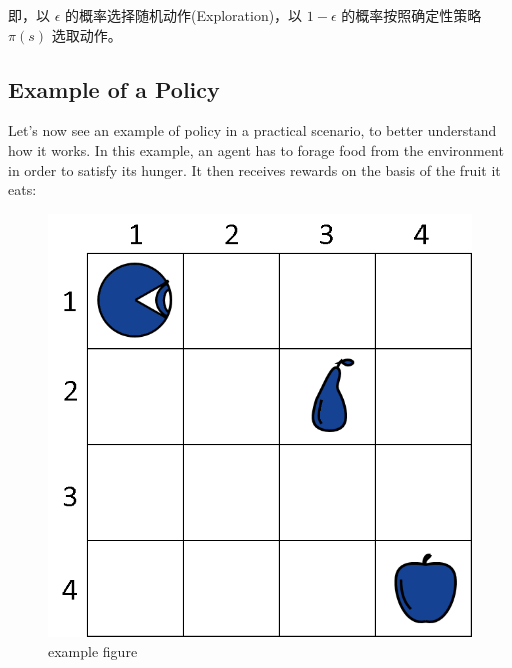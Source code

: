 即，以 $\epsilon$ 的概率选择随机动作(Exploration)，以 $1 - \epsilon$ 
的概率按照确定性策略 $\pi(s)$ 选取动作。


\subsection{Example of a Policy}

Let's now see an example of policy in a practical scenario, 
to better understand how it works. In this example, an agent 
has to forage food from the environment in order to satisfy 
its hunger. It then receives rewards on the basis of the 
fruit it eats:

\begin{figure}[h]

\centering
\includegraphics[scale=0.5]{pix/example1.png}
\caption{example figure}
\end{figure}

